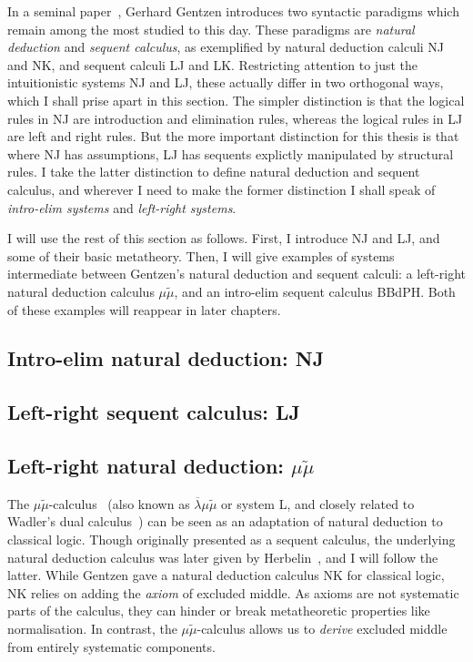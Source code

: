 In a seminal paper~\cite{Gentzen64}, Gerhard Gentzen introduces two syntactic
paradigms which remain among the most studied to this day.
These paradigms are \emph{natural deduction} and \emph{sequent calculus}, as
exemplified by natural deduction calculi NJ and NK, and sequent calculi LJ and
LK.
Restricting attention to just the intuitionistic systems NJ and LJ, these
actually differ in two orthogonal ways, which I shall prise apart in this
section.
The simpler distinction is that the logical rules in NJ are introduction and
elimination rules, whereas the logical rules in LJ are left and right rules.
But the more important distinction for this thesis is that where NJ has
assumptions, LJ has sequents explictly manipulated by structural rules.
I take the latter distinction to define natural deduction and sequent calculus,
and wherever I need to make the former distinction I shall speak of
\emph{intro-elim systems} and \emph{left-right systems}.

I will use the rest of this section as follows.
First, I introduce NJ and LJ, and some of their basic metatheory.
Then, I will give examples of systems intermediate between Gentzen's natural
deduction and sequent calculi: a left-right natural deduction calculus
$\mu\tilde\mu$, and an intro-elim sequent calculus BBdPH\@.
Both of these examples will reappear in later chapters.

\subsection{Intro-elim natural deduction: NJ}

\subsection{Left-right sequent calculus: LJ}

\subsection{Left-right natural deduction: $\mu\tilde\mu$}
The $\mu\tilde\mu$-calculus~\cite{CH00} (also known as
$\overline\lambda\mu\tilde\mu$ or system L, and closely related to Wadler's
dual calculus~\cite{Wadler03}) can be seen as an adaptation of natural deduction
to classical logic.
Though originally presented as a sequent calculus, the underlying natural
deduction calculus was later given by Herbelin~\cite[p.\ 12]{Herbelin-hab}, and
I will follow the latter.
While Gentzen gave a natural deduction calculus NK for classical logic, NK
relies on adding the \emph{axiom} of excluded middle.
As axioms are not systematic parts of the calculus, they can hinder or break
metatheoretic properties like normalisation.
In contrast, the $\mu\tilde\mu$-calculus allows us to \emph{derive} excluded
middle from entirely systematic components.

